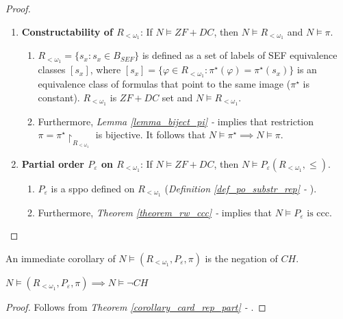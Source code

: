 \begin{proof}
\begin{enumerate}
\begin{enumerate}[label=(\roman*)]
\begin{itemize}
            \end{itemize}
        \end{enumerate}
        \item \textbf{Constructability of $R_{<\omega_1}$}: If $N \models ZF + DC$, then $N \models R_{<\omega_1}$ and $N \models \pi$.
        \begin{enumerate}[label=(\roman*)]
            \item $R_{<\omega_1} = \{s_x: s_x \in B_{SEF}\}$ is defined as a set of labels of SEF equivalence classes $[s_x]$, where $[s_x] = \{\varphi \in R_{<\omega_1}: \pi^\star(\varphi) = \pi^\star(s_x) \}$ is an equivalence class of formulas that point to the same image ($\pi^\star$ is constant). $R_{<\omega_1}$ is $ZF+DC$ set and $N \models R_{<\omega_1}$.
            \item Furthermore, \textit{Lemma \ref{lemma_biject_pi} - } implies that restriction $\pi = \pi^\star{\upharpoonright}_{R_{<\omega_1}}$ is bijective. It follows that $N \models \pi^\star \implies N \models \pi$.
        \end{enumerate}
        \item \textbf{Partial order $P_\varepsilon$ on $R_{<\omega_1}$}: If $N \models ZF + DC$, then $N \models P_\varepsilon(R_{<\omega_1}, \leq)$.
        \begin{enumerate}[label=(\roman*)]
            \item $P_\varepsilon$ is a sppo defined on $R_{<\omega_1}$ (\textit{Definition \ref{def_po_substr_rep} - }).
            \item Furthermore, \textit{Theorem \ref{theorem_rw_ccc} - } implies that $N \models P_\varepsilon \text{ is ccc}$.
        \end{enumerate}
    \end{enumerate}
\end{proof}

An immediate corollary of $N \models (R_{<\omega_1}, P_\varepsilon, \pi)$ is the negation of $CH$.

\begin{corollary}[Failure of $CH$ in $N$]\label{corollary_ch_fails_in_n}
    $N \models (R_{<\omega_1}, P_\varepsilon, \pi) \implies N \models \neg CH$
\end{corollary}
\begin{proof}
    Follows from \textit{Theorem \ref{corollary_card_rep_part} - }.
\end{proof}

